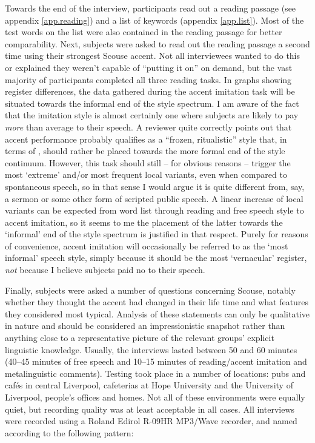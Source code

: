 Towards the end of the interview, participants read out a reading passage (see appendix \ref{app.reading}) and a list of keywords (appendix \ref{app.list}).
Most of the test words on the list were also contained in the reading passage for better comparability.
Next, subjects were asked to read out the reading passage a second time using their strongest Scouse accent. Not all interviewees wanted to do this or explained they weren't capable of ``putting it on'' on demand, but the vast majority of participants completed all three reading tasks.
In graphs showing register differences, the data gathered during the accent imitation task will be situated towards the informal end of the style spectrum.
I am aware of the fact that the imitation style is almost certainly one where subjects are likely to pay \emph{more} than average  to their speech.
A reviewer quite correctly points out that accent performance probably qualifies as a \enquote{frozen, ritualistic} style \parencite{labov1972} that, in terms of , should rather be placed towards the more formal end of the style continuum.
However, this task should still -- for obvious reasons -- trigger the most \enquote*{extreme} and/or most frequent local variants, even when compared to spontaneous speech, so in that sense I would argue it is quite different from, say, a sermon or some other form of scripted public speech.
A linear increase of local variants can be expected from word list through reading and free speech style to accent imitation, so it seems to me the placement of the latter towards the \enquote*{informal} end of the style spectrum is justified in that respect.
Purely for reasons of convenience, accent imitation will occasionally be referred to as the \enquote*{most informal} speech style, simply because it should be the most \enquote*{vernacular} register, \emph{not} because I believe subjects paid no  to their speech.

Finally, subjects were asked a number of questions concerning Scouse, notably whether they thought the accent had changed in their life time and what features they considered most typical.
Analysis of these statements can only be qualitative in nature and should be considered an impressionistic snapshot rather than anything close to a representative picture of the relevant groups' explicit linguistic knowledge. Usually, the interviews lasted between 50 and 60 minutes (40--45 minutes of free speech and 10--15 minutes of reading/accent imitation and metalinguistic comments).
Testing took place in a number of locations: pubs and cafés in central Liverpool, cafeterias at Hope University and the University of Liverpool, people's offices and homes.
Not all of these environments were equally quiet, but recording quality was at least acceptable in all cases. All interviews were recorded using a Roland Edirol R-09HR MP3/Wave recorder, and named according to the following pattern:

